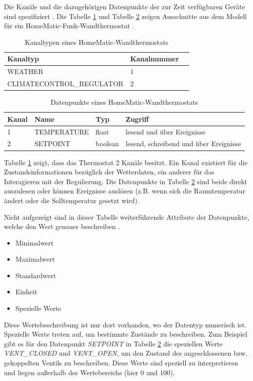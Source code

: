Die Kanäle und die dazugehörigen Datenpunkte der zur Zeit verfügbaren Geräte sind
spezifiziert \cite{hmscript4}.
Die Tabelle \ref{tab_hm_chan} und Tabelle \ref{tab_hm_dp} zeigen Ausschnitte aus dem Modell für ein
HomeMatic-Funk-Wandthermostat \cite[Seite 12]{hmscript4}.

\begin{table}[h]
\begin{tabular}{|l|l|l|}
\hline
Kanaltyp & Kanalnummer \\
\hline
WEATHER & 1 \\
\hline
CLIMATECONTROL\_REGULATOR & 2 \\
\hline
\end{tabular}
\caption{Kanaltypen eines HomeMatic-Wandthermostats}
\label{tab_hm_chan}
\end{table}

\begin{table}[h]
\begin{tabular}{|l|l|l|l|}
\hline
Kanal & Name & Typ & Zugriff \\
\hline
1 & TEMPERATURE & float & lesend und über Ereignisse \\
\hline
2 & SETPOINT & boolean & lesend, schreibend und über Ereignisse \\
\hline
\end{tabular}
\caption{Datenpunkte eines HomeMatic-Wandthermostats}
\label{tab_hm_dp}
\end{table}

Tabelle \ref{tab_hm_chan} zeigt, dass das Thermostat 2 Kanäle besitzt.
Ein Kanal existiert für die Zustandsinformationen bezüglich der Wetterdaten, ein anderer
für das Interagieren mit der Regulierung.
Die Datenpunkte in Tabelle \ref{tab_hm_dp} sind beide direkt auszulesen oder können
Ereignisse auslösen (z.B. wenn sich die Raumtemperatur ändert oder die Solltemperatur
gesetzt wird).

Nicht aufgezeigt sind in dieser Tabelle weiterführende Attribute der Datenpunkte, welche
den Wert genauer beschreiben \cite[Seite 3]{hmscript4}.

\begin{itemize}
\item Minimalwert
\item Maximalwert
\item Standardwert
\item Einheit
\item Spezielle Werte
\end{itemize}

Diese Wertebeschreibung ist nur dort vorhanden, wo der Datentyp numerisch ist.
Spezielle Werte treten auf, um bestimmte Zustände zu beschreiben.
Zum Beispiel gibt es für den Datenpunkt \emph{SETPOINT} in Tabelle \ref{tab_hm_dp}
die speziellen Werte \emph{VENT\_CLOSED} und \emph{VENT\_OPEN}, um den Zustand des angeschlossenen
bzw. gekoppelten Ventils zu beschreiben.
Diese Werte sind speziell zu interpretieren und liegen außerhalb des Wertebereichs
(hier 0 und 100).

